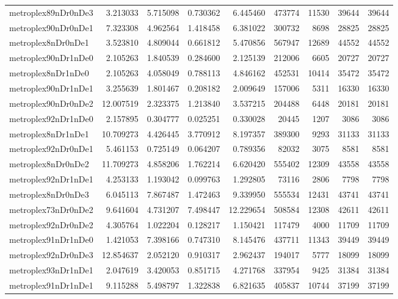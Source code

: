 \begin{longtable}{|l|r|r|r|r|r|r|r|r|}
metroplex89nDr0nDe3 & 3.213033 & 5.715098 & 0.730362 & 6.445460 & 473774 & 11530 & 39644 & 39644 \\
metroplex90nDr0nDe1 & 7.323308 & 4.962564 & 1.418458 & 6.381022 & 300732 & 8698 & 28825 & 28825 \\
metroplex8nDr0nDe1 & 3.523810 & 4.809044 & 0.661812 & 5.470856 & 567947 & 12689 & 44552 & 44552 \\
metroplex90nDr1nDe0 & 2.105263 & 1.840539 & 0.284600 & 2.125139 & 212006 & 6605 & 20727 & 20727 \\
metroplex8nDr1nDe0 & 2.105263 & 4.058049 & 0.788113 & 4.846162 & 452531 & 10414 & 35472 & 35472 \\
metroplex90nDr1nDe1 & 3.255639 & 1.801467 & 0.208182 & 2.009649 & 157006 & 5311 & 16330 & 16330 \\
metroplex90nDr0nDe2 & 12.007519 & 2.323375 & 1.213840 & 3.537215 & 204488 & 6448 & 20181 & 20181 \\
metroplex92nDr1nDe0 & 2.157895 & 0.304777 & 0.025251 & 0.330028 & 20445 & 1207 & 3086 & 3086 \\
metroplex8nDr1nDe1 & 10.709273 & 4.426445 & 3.770912 & 8.197357 & 389300 & 9293 & 31133 & 31133 \\
metroplex92nDr0nDe1 & 5.461153 & 0.725149 & 0.064207 & 0.789356 & 82032 & 3075 & 8581 & 8581 \\
metroplex8nDr0nDe2 & 11.709273 & 4.858206 & 1.762214 & 6.620420 & 555402 & 12309 & 43558 & 43558 \\
metroplex92nDr1nDe1 & 4.253133 & 1.193042 & 0.099763 & 1.292805 & 73116 & 2806 & 7798 & 7798 \\
metroplex8nDr0nDe3 & 6.045113 & 7.867487 & 1.472463 & 9.339950 & 555534 & 12431 & 43741 & 43741 \\
metroplex73nDr0nDe2 & 9.641604 & 4.731207 & 7.498447 & 12.229654 & 508584 & 12308 & 42611 & 42611 \\
metroplex92nDr0nDe2 & 4.305764 & 1.022204 & 0.128217 & 1.150421 & 117479 & 4000 & 11709 & 11709 \\
metroplex91nDr1nDe0 & 1.421053 & 7.398166 & 0.747310 & 8.145476 & 437711 & 11343 & 39449 & 39449 \\
metroplex92nDr0nDe3 & 12.854637 & 2.052120 & 0.910317 & 2.962437 & 194017 & 5777 & 18099 & 18099 \\
metroplex93nDr1nDe1 & 2.047619 & 3.420053 & 0.851715 & 4.271768 & 337954 & 9425 & 31384 & 31384 \\
metroplex91nDr1nDe1 & 9.115288 & 5.498797 & 1.322838 & 6.821635 & 405837 & 10744 & 37199 & 37199 \\

\end{longtable}
